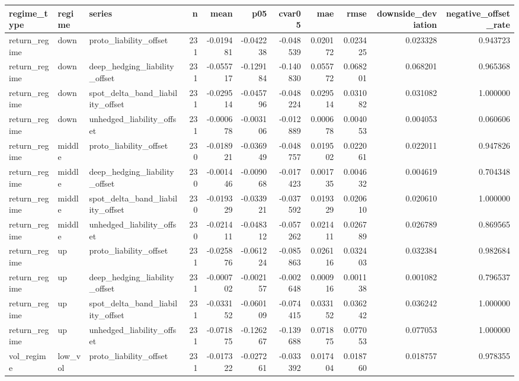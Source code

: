 \begin{tabular}{lllrrrrrrrr}
\toprule
regime\_type & regime & series & n & mean & p05 & cvar05 & mae & rmse & downside\_deviation & negative\_offset\_rate \\
\midrule
return\_regime & down & proto\_liability\_offset & 231 & -0.019481 & -0.042238 & -0.048539 & 0.020172 & 0.023425 & 0.023328 & 0.943723 \\
return\_regime & down & deep\_hedging\_liability\_offset & 231 & -0.055717 & -0.129184 & -0.140830 & 0.055772 & 0.068201 & 0.068201 & 0.965368 \\
return\_regime & down & spot\_delta\_band\_liability\_offset & 231 & -0.029514 & -0.045796 & -0.048224 & 0.029514 & 0.031082 & 0.031082 & 1.000000 \\
return\_regime & down & unhedged\_liability\_offset & 231 & -0.000678 & -0.003106 & -0.012889 & 0.000678 & 0.004053 & 0.004053 & 0.060606 \\
return\_regime & middle & proto\_liability\_offset & 230 & -0.018921 & -0.036949 & -0.048757 & 0.019502 & 0.022061 & 0.022011 & 0.947826 \\
return\_regime & middle & deep\_hedging\_liability\_offset & 230 & -0.001446 & -0.009068 & -0.017423 & 0.001735 & 0.004632 & 0.004619 & 0.704348 \\
return\_regime & middle & spot\_delta\_band\_liability\_offset & 230 & -0.019329 & -0.033921 & -0.037592 & 0.019329 & 0.020610 & 0.020610 & 1.000000 \\
return\_regime & middle & unhedged\_liability\_offset & 230 & -0.021411 & -0.048312 & -0.057262 & 0.021411 & 0.026789 & 0.026789 & 0.869565 \\
return\_regime & up & proto\_liability\_offset & 231 & -0.025876 & -0.061224 & -0.085863 & 0.026116 & 0.032403 & 0.032384 & 0.982684 \\
return\_regime & up & deep\_hedging\_liability\_offset & 231 & -0.000702 & -0.002157 & -0.002648 & 0.000916 & 0.001138 & 0.001082 & 0.796537 \\
return\_regime & up & spot\_delta\_band\_liability\_offset & 231 & -0.033152 & -0.060109 & -0.074415 & 0.033152 & 0.036242 & 0.036242 & 1.000000 \\
return\_regime & up & unhedged\_liability\_offset & 231 & -0.071875 & -0.126267 & -0.139688 & 0.071875 & 0.077053 & 0.077053 & 1.000000 \\
vol\_regime & low\_vol & proto\_liability\_offset & 231 & -0.017322 & -0.027261 & -0.033392 & 0.017404 & 0.018760 & 0.018757 & 0.978355 \\

\end{tabular}
